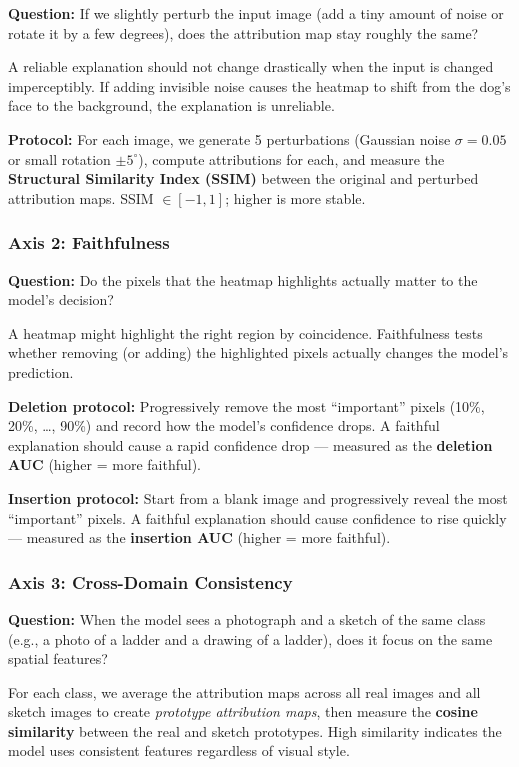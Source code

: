 \documentclass[12pt, a4paper]{article}
\begin{document}
\textbf{Question:} If we slightly perturb the input image (add a tiny amount
of noise or rotate it by a few degrees), does the attribution map stay roughly
the same?

A reliable explanation should not change drastically when the input is changed
imperceptibly.  If adding invisible noise causes the heatmap to shift from the
dog's face to the background, the explanation is unreliable.

\textbf{Protocol:} For each image, we generate 5 perturbations (Gaussian noise
$\sigma = 0.05$ or small rotation $\pm 5^{\circ}$), compute attributions for
each, and measure the \textbf{Structural Similarity Index (SSIM)} between the
original and perturbed attribution maps.  SSIM $\in [-1, 1]$; higher is more
stable.

\subsubsection{Axis 2: Faithfulness}

\textbf{Question:} Do the pixels that the heatmap highlights actually matter to
the model's decision?

A heatmap might highlight the right region by coincidence.  Faithfulness tests
whether removing (or adding) the highlighted pixels actually changes the
model's prediction.

\textbf{Deletion protocol:} Progressively remove the most ``important'' pixels
(10\%, 20\%, \ldots, 90\%) and record how the model's confidence drops.  A
faithful explanation should cause a rapid confidence drop --- measured as the
\textbf{deletion AUC} (higher = more faithful).

\textbf{Insertion protocol:} Start from a blank image and progressively reveal
the most ``important'' pixels.  A faithful explanation should cause confidence
to rise quickly --- measured as the \textbf{insertion AUC} (higher = more
faithful).

\subsubsection{Axis 3: Cross-Domain Consistency}

\textbf{Question:} When the model sees a photograph and a sketch of the same
class (e.g., a photo of a ladder and a drawing of a ladder), does it
focus on the same spatial features?

For each class, we average the attribution maps across all real images and all
sketch images to create \emph{prototype attribution maps}, then measure the
\textbf{cosine similarity} between the real and sketch prototypes.  High
similarity indicates the model uses consistent features regardless of visual
style.
\end{document}
